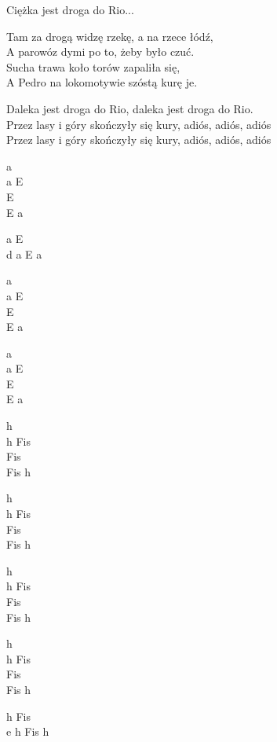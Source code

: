\begin{text}
    \vin Ciężka jest droga do Rio...

    Tam za drogą widzę rzekę, a na rzece łódź,\\
    A parowóz dymi po to, żeby było czuć.\\
    Sucha trawa koło torów zapaliła się,\\
    A Pedro na lokomotywie szóstą kurę je.

    Daleka jest droga do Rio, daleka jest droga do Rio.\\
    Przez lasy i góry skończyły się kury, adiós, adiós, adiós\\
    Przez lasy i góry skończyły się kury, adiós, adiós, adiós
\end{text}
\begin{chord}
    a\\
    a E\\
    E\\
    E a

    a E\\
    d a E a

    a\\
    a E\\
    E\\
    E a\\
    \hfill\break

    a\\
    a E\\
    E\\
    E a\\
    \hfill\break

    h\\
    h Fis\\
    Fis\\
    Fis h\\
    \hfill\break

    h\\
    h Fis\\
    Fis\\
    Fis h\\
    \hfill\break

    h\\
    h Fis\\
    Fis\\
    Fis h\\
    \hfill\break

    h\\
    h Fis\\
    Fis\\
    Fis h

    h Fis\\
    e h Fis h
\end{chord}